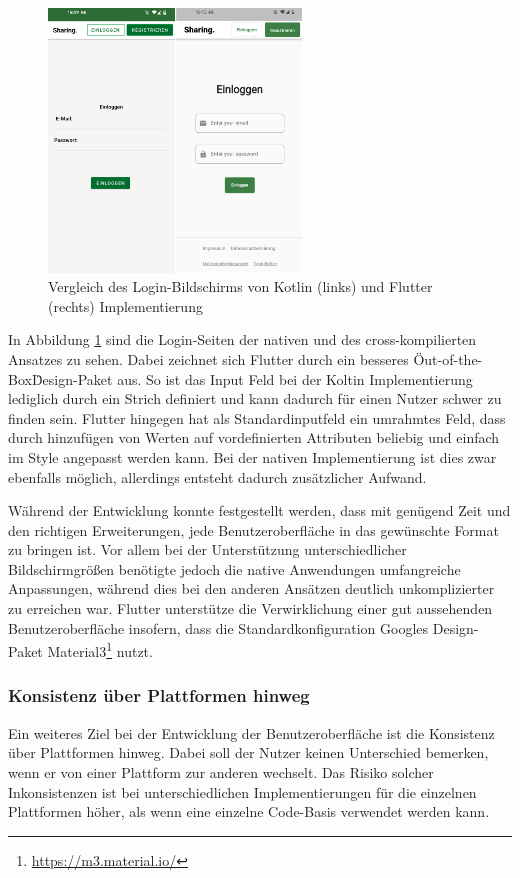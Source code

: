 \begin{figure}[ht]
  \centering
  \includegraphics[height=7cm,keepaspectratio]{images/Login_vergleich.png} 
  \caption[Vergleich des Login-Bildschirms von Kotlin und Flutter Implementierung.]{Vergleich des Login-Bildschirms von Kotlin (links) und Flutter (rechts) Implementierung}
  \label{fig:loginscreen}
\end{figure}

In Abbildung \ref{fig:loginscreen} sind die Login-Seiten der nativen und des cross-kompilierten Ansatzes zu sehen. Dabei zeichnet sich Flutter durch ein besseres \"Out-of-the-Box\" Design-Paket aus. So ist das Input Feld bei der Koltin Implementierung  lediglich durch ein Strich definiert und kann dadurch für einen Nutzer schwer zu finden sein. Flutter hingegen hat als Standardinputfeld ein umrahmtes Feld, dass durch hinzufügen von Werten auf vordefinierten Attributen beliebig und einfach im Style angepasst werden kann. Bei der nativen Implementierung ist dies zwar ebenfalls möglich, allerdings entsteht dadurch zusätzlicher Aufwand.

Während der Entwicklung konnte festgestellt werden, dass mit genügend Zeit und den richtigen Erweiterungen, jede Benutzeroberfläche in das gewünschte Format zu bringen ist. Vor allem bei der Unterstützung unterschiedlicher Bildschirmgrößen benötigte jedoch die native Anwendungen umfangreiche Anpassungen, während dies bei den anderen Ansätzen deutlich unkomplizierter zu erreichen war. Flutter unterstütze die Verwirklichung einer gut aussehenden Benutzeroberfläche insofern, dass die Standardkonfiguration Googles Design-Paket Material3\footnote{\url{https://m3.material.io/}} nutzt.

\subsubsection{Konsistenz über Plattformen hinweg}
Ein weiteres Ziel bei der Entwicklung der Benutzeroberfläche ist die Konsistenz über Plattformen hinweg.
Dabei soll der Nutzer keinen Unterschied bemerken, wenn er von einer Plattform zur anderen wechselt. 
Das Risiko solcher Inkonsistenzen ist bei unterschiedlichen Implementierungen für die einzelnen Plattformen höher, als wenn eine einzelne Code-Basis verwendet werden kann.


